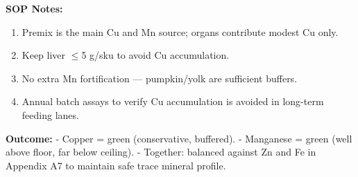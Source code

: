 \textbf{SOP Notes:}  
\begin{enumerate}[leftmargin=1.2em]
  \item Premix is the main Cu and Mn source; organs contribute modest Cu only.  
  \item Keep liver $\leq$5 g/sku to avoid Cu accumulation.  
  \item No extra Mn fortification --- pumpkin/yolk are sufficient buffers.  
  \item Annual batch assays to verify Cu accumulation is avoided in long-term feeding lanes.  
\end{enumerate}

\textbf{Outcome:}  
- Copper = green (conservative, buffered).  
- Manganese = green (well above floor, far below ceiling).  
- Together: balanced against Zn and Fe in Appendix A7 to maintain safe trace mineral profile.
